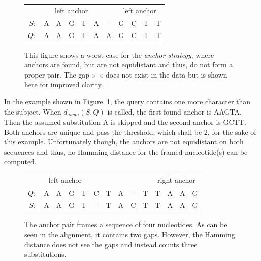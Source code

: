 \documentclass[a4paper,
  10pt,
  english,
  DIV=12,
  BCOR=8mm]{scrbook}
\newcommand{\algo}[1]{\textsc{{#1}}}
\newcommand{\andi}{\algo{andi} }
\newcommand{\word}[1]{\textsf{\small#1}}
\newcommand{\wchar}[1]{\textsf{\small#1}}
\begin{document}
\begin{figure}
  \centering
  \begin{tabular}{rccccc|ccccc|}
    & \multicolumn{5}{c}{left anchor} &  & \multicolumn{4}{c}{left anchor} \\
    \cline{2-6}\cline{8-11}
    \multicolumn{1}{r|}{$S\colon$} & \word{A} & \word{A} & \word{G} & \word{T} & \word{A} & \multicolumn{1}{c|}{\word{--}} & \word{G} & \word{C} & \wchar{T} & \wchar{T} \\
    \multicolumn{1}{r|}{$Q\colon$} & \word{A} & \word{A} & \word{G} & \word{T} & \word{A} & \multicolumn{1}{c|}{\word{A}} & \word{G} & \word{C} & \wchar{T} & \wchar{T} \\
    \cline{2-6}\cline{8-11}
  \end{tabular}
  \caption[\andi Worst Case 1]{\label{fig:worst1} This figure shows a worst case for the \emph{anchor strategy}, where anchors are found, but are not equidistant and thus, do not form a proper pair. The gap »\word{--}« does not exist in the data but is shown here for improved clarity.}
\end{figure}

In the example shown in Figure~\ref{fig:worst1}, the query contains one more character than the subject. When $d_{asym}(S,Q)$ is called, the first found anchor is \word{AAGTA}. Then the assumed substitution \wchar{A} is skipped and the second anchor is \word{GCTT}. Both anchors are unique and pass the threshold, which shall be 2, for the sake of this example. Unfortunately though, the anchors are not equidistant on both sequences and thus, no Hamming distance for the framed nucleotide(s) can be computed.

\begin{figure}
  \centering
  \begin{tabular}{rcccc|ccccc|cccc|}
    & \multicolumn{4}{c}{left anchor} & \multicolumn{5}{c}{} & \multicolumn{4}{c}{right anchor} \\
    \cline{2-5}\cline{11-14}
    \multicolumn{1}{r|}{$Q\colon$} & \wchar{A} & \wchar{A} & \wchar{G} & \wchar{T} & \wchar{C} & \wchar{T} & \wchar{A} & \wchar{--} & \wchar{T} & \wchar{T} & \wchar{A} & \wchar{A} & \wchar{G} \\ 
    \multicolumn{1}{r|}{$S\colon$} & \wchar{A} & \wchar{A} & \wchar{G} & \wchar{T} & \wchar{--} & \wchar{T} & \wchar{A} & \wchar{C} & \wchar{T} & \wchar{T} & \wchar{A} & \wchar{A} & \wchar{G} \\
    \cline{2-5}\cline{11-14}
  \end{tabular}
  \caption[\andi Worst Case 2]{\label{fig:worst2} The anchor pair frames a sequence of four nucleotides. As can be seen in the alignment, it contains two gaps. However, the Hamming distance does not see the gaps and instead counts three substitutions.}
\end{figure}
\end{document}
